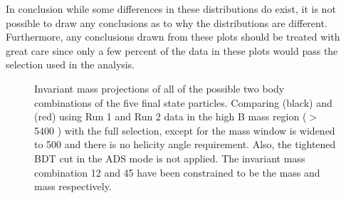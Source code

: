 In conclusion while some differences in these distributions do exist, it is not possible to draw any conclusions as to why the distributions are different. Furthermore, any conclusions drawn from these plots should be treated with great care since only a few percent of the data in these plots would pass the \Kstarm selection used in the analysis.   


\begin{figure}
\hfill
{}
\caption{Invariant mass projections of all of the possible two body combinations of the five final state particles. Comparing \decay{\Dz}{\Km\pip} (black) and \decay{\Dz}{\Kp\pim} (red) using Run 1 and Run 2 data in the high B mass region ($>$ 5400 \mevcc) with the full selection, except for the \Kstar mass window is widened to 500 \mev and there is no \KS helicity angle requirement. Also, the tightened BDT cut in the ADS mode is not applied. The invariant mass combination 12 and 45 have been constrained to be the \Dz mass and \KS mass respectively.}
\label{projections2bodydtf}
\end{figure}

